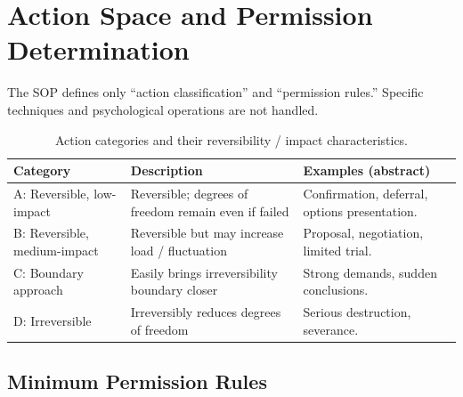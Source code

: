 
\section{Action Space and Permission Determination}
\label{sec:sop-os-action-space}

The SOP defines only ``action classification'' and ``permission
rules.'' Specific techniques and psychological operations are not
handled.

\begin{table}[ht]
\centering
\small
\begin{tabularx}{\linewidth}{lXX}
\toprule
\textbf{Category} & \textbf{Description} & \textbf{Examples (abstract)} \\
\midrule

A: Reversible, low-impact
& Reversible; degrees of freedom remain even if failed
& Confirmation, deferral, options presentation. \\

B: Reversible, medium-impact
& Reversible but may increase load / fluctuation
& Proposal, negotiation, limited trial. \\

C: Boundary approach
& Easily brings irreversibility boundary closer
& Strong demands, sudden conclusions. \\

D: Irreversible
& Irreversibly reduces degrees of freedom
& Serious destruction, severance. \\

\bottomrule
\end{tabularx}
\caption[SOP OS action categories]{Action categories and their
reversibility / impact characteristics.}
\label{tab:sop-os-categories}
\end{table}

\subsection{Minimum Permission Rules}
\label{sec:sop-os-permission-rules}

